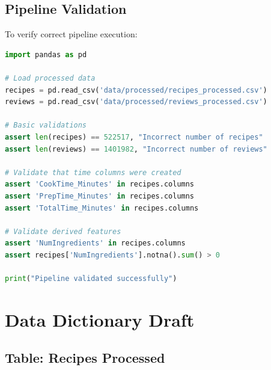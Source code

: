 \documentclass[11pt,a4paper]{article}
\begin{document}
\subsection{Pipeline Validation}

To verify correct pipeline execution:

\begin{lstlisting}[language=Python, caption={Validation script}]
import pandas as pd

# Load processed data
recipes = pd.read_csv('data/processed/recipes_processed.csv')
reviews = pd.read_csv('data/processed/reviews_processed.csv')

# Basic validations
assert len(recipes) == 522517, "Incorrect number of recipes"
assert len(reviews) == 1401982, "Incorrect number of reviews"

# Validate that time columns were created
assert 'CookTime_Minutes' in recipes.columns
assert 'PrepTime_Minutes' in recipes.columns
assert 'TotalTime_Minutes' in recipes.columns

# Validate derived features
assert 'NumIngredients' in recipes.columns
assert recipes['NumIngredients'].notna().sum() > 0

print("Pipeline validated successfully")
\end{lstlisting}

\section{Data Dictionary Draft}

\subsection{Table: Recipes Processed}
\end{document}
